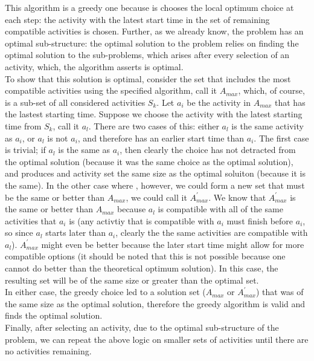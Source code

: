 \documentclass[11pts]{article}
\begin{document}
\begin{enumerate}
  This algorithm is a greedy one because is chooses the local optimum choice
  at each step: the activity with the latest start time in the set of
  remaining compatible activities is chosen. Further, as we already know,
  the problem has an optimal sub-structure: the optimal solution to the
  problem relies on finding the optimal solution to the sub-problems, which
  arises after every selection of an activity, which, the algorithm asserts
  is optimal. \\

  To show that this solution is optimal, consider the set that includes the
  most compatible activities using the specified algorithm, call it $A_{max}$,
  which, of course, is a sub-set of all considered activities $S_k$.
  Let $a_i$ be the activity in $A_{max}$ that has the lastest starting time.
  Suppose we choose the activity with the
  latest starting time from $S_k$, call it $a_l$. There are two cases
  of this: either $a_l$ is the same activity as $a_i$, or $a_l$ is not $a_i$,
  and therefore has an earlier start time than $a_i$.
  The first case is trivial; if $a_l$ is the same as $a_i$, then clearly the
  choice has not detracted from the optimal solution (because it was the same
  choice as the optimal solution), and produces and activity set
  the same size as the optimal soluiton (because it is the same).
  In the other case where , however, we could form a
  new set that must be the same or better than $A_{max}$, we could call it
  $A_{max}^{'}$. We know that $A_{max}^{'}$ is the same or better than
  $A_{max}$ because $a_l$ is compatible with all of the same activities that
  $a_i$ is (any activtiy that is compatible with $a_i$ must finish
  before $a_i$, so since $a_l$ starts later than $a_i$, clearly the the
  same activities are compatible with $a_l$). $A_{max}^{'}$ might even be
  better because the later start time might allow for more compatible
  options (it should be noted that this is not possible because one cannot
  do better than the theoretical optimum solution). In this case,
  the resulting set will be of the same size or greater than the optimal set. \\

  In either case, the greedy
  choice led to a solution set ($A_{max}$ or $A_{max}^{'}$) that was of the
  same size as the optimal solution, therefore the greedy algorithm is valid
  and finds the optimal solution. \\

  Finally, after selecting an activity, due to the optimal
  sub-structure of the problem, we can repeat the above logic on smaller
  sets of activities until there are no activities remaining. \\


\end{enumerate}
\end{document}
